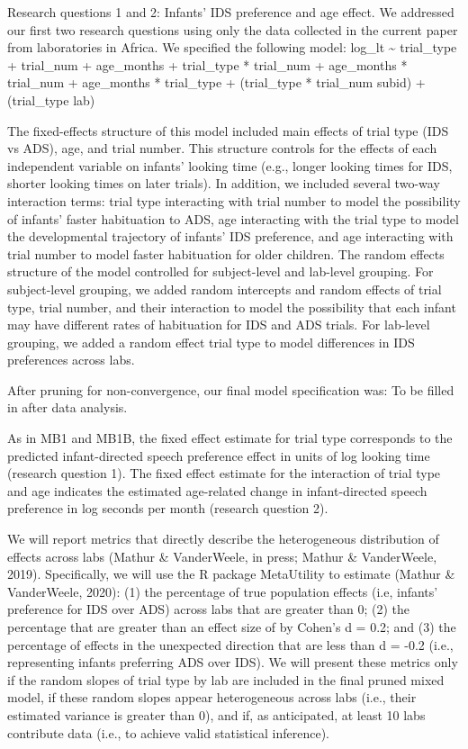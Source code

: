 \documentclass[
  ,man,floatsintext]{apa6}
\begin{document}
Research questions 1 and 2: Infants' IDS preference and age effect. We addressed our first two research questions using only the data collected in the current paper from laboratories in Africa. We specified the following model:
log\_lt \textasciitilde{} trial\_type + trial\_num + age\_months +
trial\_type * trial\_num +
age\_months * trial\_num +
age\_months * trial\_type +
(trial\_type * trial\_num \textbar{} subid) +
(trial\_type \textbar{} lab)

The fixed-effects structure of this model included main effects of trial type (IDS vs ADS), age, and trial number. This structure controls for the effects of each independent variable on infants' looking time (e.g., longer looking times for IDS, shorter looking times on later trials). In addition, we included several two-way interaction terms: trial type interacting with trial number to model the possibility of infants' faster habituation to ADS, age interacting with the trial type to model the developmental trajectory of infants' IDS preference, and age interacting with trial number to model faster habituation for older children. The random effects structure of the model controlled for subject-level and lab-level grouping. For subject-level grouping, we added random intercepts and random effects of trial type, trial number, and their interaction to model the possibility that each infant may have different rates of habituation for IDS and ADS trials. For lab-level grouping, we added a random effect trial type to model differences in IDS preferences across labs.

After pruning for non-convergence, our final model specification was: To be filled in after data analysis.

As in MB1 and MB1B, the fixed effect estimate for trial type corresponds to the predicted infant-directed speech preference effect in units of log looking time (research question 1). The fixed effect estimate for the interaction of trial type and age indicates the estimated age-related change in infant-directed speech preference in log seconds per month (research question 2).

We will report metrics that directly describe the heterogeneous distribution of effects across labs (Mathur \& VanderWeele, in press; Mathur \& VanderWeele, 2019). Specifically, we will use the R package MetaUtility to estimate (Mathur \& VanderWeele, 2020): (1) the percentage of true population effects (i.e, infants' preference for IDS over ADS) across labs that are greater than 0; (2) the percentage that are greater than an effect size of by Cohen's d = 0.2; and (3) the percentage of effects in the unexpected direction that are less than d = -0.2 (i.e., representing infants preferring ADS over IDS). We will present these metrics only if the random slopes of trial type by lab are included in the final pruned mixed model, if these random slopes appear heterogeneous across labs (i.e., their estimated variance is greater than 0), and if, as anticipated, at least 10 labs contribute data (i.e., to achieve valid statistical inference).
\end{document}
